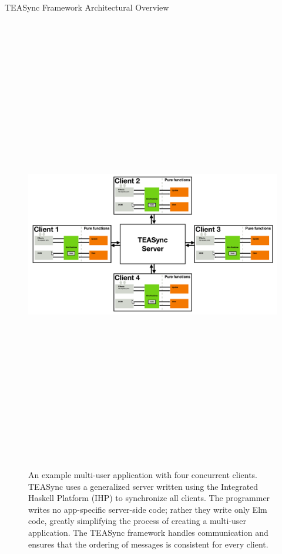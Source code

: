 \documentclass[22pt]{beamer}
\begin{document}
\begin{frame}[fragile]
\begin{textblock}{7.25}
        \begin{block}{\fontsize{37}{20}\selectfont TEASync Framework Architectural Overview}
            \begin{figure}
                \includegraphics[height = 20cm]{figs/TEASyncDiagram.pdf}
                \caption{An example multi-user application with four concurrent clients. TEASync uses a generalized server written using the Integrated Haskell Platform (IHP)
                    to synchronize all clients. The programmer writes no app-specific server-side code; rather they write only Elm code,
                    greatly simplifying the process of creating a multi-user application. The TEASync framework handles
                    communication and ensures that the ordering of messages is consistent for every client.}
            \end{figure}
            \vspace{-6mm}
        \end{block}
    \end{textblock}


\end{frame}
\end{document}
